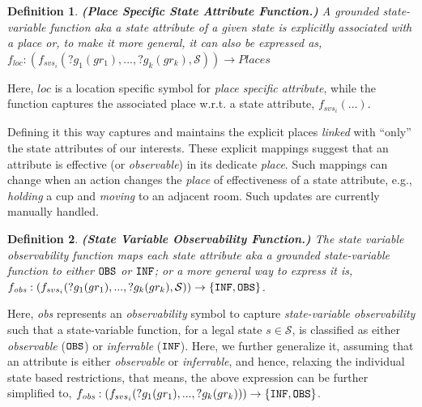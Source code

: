 \documentclass[letterpaper]{article} %
\newtheorem{definition}{Definition}
\begin{document}

\begin{definition}
    \textbf{(Place Specific State Attribute Function.)} A {\em grounded} state-variable function {\em aka} a state attribute of a given state is explicitly associated with a place
    or, to make it more general, it can also be expressed as, 
    $f_{loc}: (f_{svs_i}(?g_1(gr_1),...,?g_k(gr_k),\mathcal{S})) \rightarrow Places$
    \label{def:pssav}
\end{definition}
Here, $\mathit{loc}$ is a location specific symbol for {\em place specific attribute}, while the function captures the associated place w.r.t. a state attribute, $f_{svs_i}(...)$.

Defining it this way captures and maintains the explicit places \textit{linked} with ``only'' the state attributes of our interests. 
These explicit mappings suggest that an attribute is effective (or \textit{observable}) in its dedicate \textit{place}.
Such mappings can change when an action changes the \textit{place} of effectiveness of a state attribute, e.g., 
\textit{holding} a cup and \textit{moving} to an adjacent room. Such updates are currently manually handled.


\begin{definition}
\textbf{(State Variable Observability Function.)} 
The state variable observability function maps each state attribute {\em aka} a grounded \textit{state-variable function} 
to either $\texttt{OBS}$ or $\texttt{INF}$; or a more general way to express it is, $f_{\textit{obs}}: (f_{svs_i}(?g_1(gr_1),...,?g_k(gr_k),\mathcal{S}
)) \rightarrow 
    \{\texttt{INF}, \texttt{OBS}\}$.
    \label{def:svof}
\end{definition}
Here, \textit{obs} represents an \textit{observability} symbol to capture \textit{state-variable observability} such that a state-variable function, for a legal state $s\in\mathcal{S}$, is classified as either \textit{observable} ($\texttt{OBS}$) or \textit{inferrable} ($\texttt{INF}$). 
Here, we further generalize it, assuming that an attribute is either \textit{observable} or \textit{inferrable}, and hence, relaxing the individual state based restrictions, that means, the above expression can be further simplified to, $f_{\textit{obs}}: (f_{svs_i}(?g_1(gr_1),...,?g_k(gr_k))) \rightarrow 
    \{\texttt{INF}, \texttt{OBS}\}$.
\end{document}
